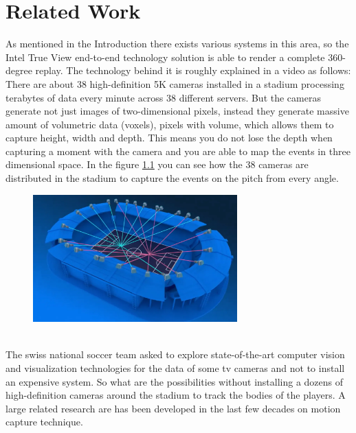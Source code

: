 \chapter{Related Work}\label{chap:relatedWork}
As mentioned in the Introduction there exists various systems in this area, so the Intel True View end-to-end technology solution \cite{intel} is able to render a complete 360-degree replay. The technology behind it is roughly explained in a video \cite{intelvideo} as follows: There are about 38 high-definition 5K cameras installed in a stadium processing terabytes of data every minute across 38 different servers. But the cameras generate not just images of two-dimensional pixels, instead they generate massive amount of volumetric data (voxels), pixels with volume, which allows them to capture height, width and depth. This means you do not lose the depth when capturing a moment with the camera and you are able to map the events in three dimensional space. In the figure \ref{fig:intelcameras} you can see how the 38 cameras are distributed in the stadium to capture the events on the pitch from every angle.
\begin{figure}[h]
	\centering
	\includegraphics[width=0.7\textwidth]{./images/intelcameras.png}
	\label{fig:intelcameras}
\end{figure}\\
The swiss national soccer team asked to explore state-of-the-art computer vision and visualization technologies for the data of some tv cameras and not to install an expensive system. So what are the possibilities without installing a dozens of high-definition cameras around the stadium to track the bodies of the players. A large related research are has been developed in the last few decades on motion capture technique. 

